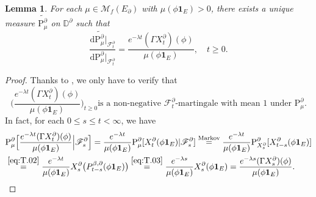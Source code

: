\documentclass[12pt,a4paper]{amsart}
\numberwithin{equation}{section}
\theoremstyle{plain}
\newtheorem{lem}[thm]{Lemma}
\theoremstyle{definition}
\theoremstyle{remark}
\begin{document}
\begin{lem} \label{thm:T.3}
	For each $\mu \in \mathcal M_f(E_\partial)$ with $\mu(\phi\mathbf 1_E)>0$, there exists 
	a unique measure $\widetilde {\mathrm P_{\mu}^\partial}$ on $\mathbb D^\partial$ such that
\[
	\frac{\mathrm d \widetilde {\mathrm P_\mu^\partial} |_{\mathscr F_t^\partial}}{\mathrm d \mathrm P^\partial_\mu|_{\mathscr F_t^\partial}} = \frac{e^{-\lambda t}(\Gamma X^\partial_t)(\phi)}{\mu(\phi\mathbf 1_E)}, \quad t\geq 0.
\]
\end{lem}
\begin{proof}
	Thanks to \cite[Lemma 18.18]{Kallenberg2002Foundations}, we only have to verify that
\[
	\Big(\frac{e^{-\lambda t} (\Gamma X_t^\partial)(\phi)}{\mu(\phi \mathbf 1_E)}\Big)_{t\geq 0} \text{is a non-negative $\mathscr F_t^\partial$-martingale with mean $1$ under $\mathrm P_\mu^\partial$.}
\]
	In fact, for each $0\leq s\leq t<\infty$, we have
\begin{align}
	& \mathrm P_\mu^\partial  \Big[\frac{e^{-\lambda t} (\Gamma X_t^\partial)(\phi)}{\mu(\phi \mathbf 1_E)}\Big| \mathscr F^\partial_s\Big]
	= \frac{e^{-\lambda t}}{\mu(\phi \mathbf 1_E)} \mathrm P_\mu^\partial  [X_t^\partial(\phi \mathbf 1_E) | \mathscr F^\partial_s]
	\overset{\text{Markov}}= \frac{e^{-\lambda t}}{\mu(\phi \mathbf 1_E)} \mathrm P^\partial_{X_s^\partial}[X_{t-s}^\partial (\phi \mathbf 1_E)]
	\\ & \overset{\eqref{eq:T.02}}= \frac{e^{-\lambda t}}{\mu(\phi \mathbf 1_E)} X_s^\partial \big(P^{\beta, \partial}_{t-s} (\phi\mathbf 1_E)\big)
	\overset{\eqref{eq:T.03}}= \frac{e^{-\lambda s}}{\mu(\phi \mathbf 1_E)} X_s^\partial (\phi\mathbf 1_E)
	= \frac{e^{-\lambda s} (\Gamma X_s^\partial)(\phi)}{\mu(\phi \mathbf 1_E)}.
	\qedhere
\end{align}
\end{proof}
\end{document}
